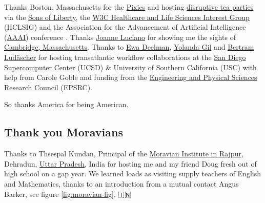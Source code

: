 \documentclass[
]{book}
\begin{document}
Thanks Boston, Massachusetts for the \href{https://en.wikipedia.org/wiki/Pixies_(band)}{Pixies} and hosting \href{https://en.wikipedia.org/wiki/Boston_Tea_Party}{disruptive tea parties} via the \href{https://en.wikipedia.org/wiki/Sons_of_Liberty}{Sons of Liberty}, the \href{https://www.w3.org/wiki/HCLSIG}{W3C Healthcare and Life Sciences Interest Group} (HCLSIG) and the Association for the Advancement of Artificial Intelligence (\href{https://en.wikipedia.org/wiki/Association_for_the_Advancement_of_Artificial_Intelligence}{AAAI}) conference \citep{aaai}. Thanks \href{https://scholar.google.com/citations?user=wWYH1IMAAAAJ}{Joanne Luciano} for showing me the sights of \href{https://en.wikipedia.org/wiki/Cambridge,_Massachusetts}{Cambridge, Massachusetts}. Thanks to \href{https://twitter.com/ewadeelman}{Ewa Deelman}, \href{https://en.wikipedia.org/wiki/Yolanda_Gil}{Yolanda Gil} and \href{https://ischool.illinois.edu/people/bertram-ludascher}{Bertram Ludäscher} for hosting transatlantic workflow collaborations at the \href{https://en.wikipedia.org/wiki/San_Diego_Supercomputer_Center}{San Diego Supercomputer Center} (UCSD) \& University of Southern California (USC) with help from Carole Goble and funding from the \href{https://en.wikipedia.org/wiki/Engineering_and_Physical_Sciences_Research_Council}{Engineering and Physical Sciences Research Council} (EPSRC).

So thanks America for being American. 🙏

\hypertarget{moravians}{%
\subsection{Thank you Moravians}\label{moravians}}

Thanks to Thsespal Kundan, Principal of the \href{https://moravianinstitute.com/}{Moravian Institute in Rajpur}, Dehradun, \href{https://en.wikipedia.org/wiki/Uttar_Pradesh}{Uttar Pradesh}, India for hosting me and my friend Doug fresh out of high school on a gap year. We learned loads as visiting supply teachers of English and Mathematics, thanks to an introduction from a mutual contact Angus Barker, see figure \ref{fig:moravian-fig}. 🇮🇳
\end{document}
